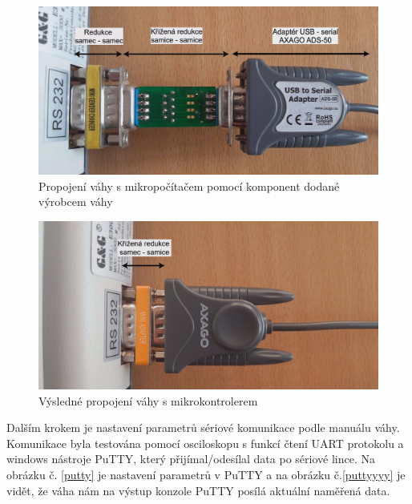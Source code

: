 \begin{figure}[H]
    \begin{center}
        \includegraphics[scale=0.27]{obrazky/zapojení váhy.jpg}
    \end{center}
    \caption{Propojení váhy s mikropočítačem pomocí komponent dodané výrobcem váhy}
    \label{propojení váhy v1}
\end{figure}

\begin{figure}[H]
    \begin{center}
        \includegraphics[scale=0.27]{obrazky/zapojeni_vahy_v2 - popis.png}
    \end{center}
    \caption{Výsledné propojení váhy s mikrokontrolerem}
    \label{propojení váhy v2}
\end{figure}

Dalším krokem je nastavení parametrů sériové komunikace podle manuálu váhy\cite{vaha_datasheed}. Komunikace byla testována pomocí osciloskopu s funkcí čtení UART protokolu a windows nástroje PuTTY, který přijímal/odesílal data po sériové lince. 
Na obrázku č. \ref{putty} je nastavení parametrů v PuTTY a na obrázku č.\ref{puttyyyy} je vidět, že váha nám na výstup konzole PuTTY posílá aktuální naměřená data.


